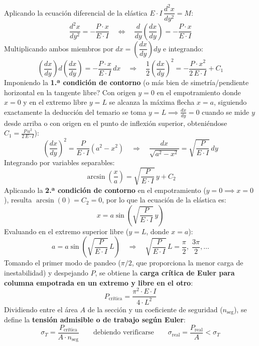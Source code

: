 Aplicando la ecuación diferencial de la elástica $E\cdot I\,\dfrac{d^2x}{dy^2} = M$:
\begin{equation*}
    \frac{d^2x}{dy^2} = -\frac{P\cdot x}{E\cdot I} \quad \Longleftrightarrow \quad \frac{d}{dy}\left(\frac{dx}{dy}\right) = -\frac{P\cdot x}{E\cdot I}
\end{equation*}
Multiplicando ambos miembros por $dx = \left(\dfrac{dx}{dy}\right)dy$ e integrando:
\begin{equation*}
    \left(\frac{dx}{dy}\right) d\left(\frac{dx}{dy}\right) = -\frac{P\cdot x}{E\cdot I}\,dx \quad \Longrightarrow \quad \frac{1}{2}\left(\frac{dx}{dy}\right)^2 = -\frac{P\cdot x^2}{2\,E\cdot I} + C_1
\end{equation*}
Imponiendo la \textbf{1.ª condición de contorno} (o más bien de simetría/pendiente horizontal en la tangente libre? Con origen $y=0$ en el empotramiento donde $x=0$ y en el extremo libre $y=L$ se alcanza la máxima flecha $x=a$, siguiendo exactamente la deducción del temario se toma $y=L \implies \frac{dx}{dy}=0$ cuando se mide $y$ desde arriba o con origen en el punto de inflexión superior, obteniéndose $C_1 = \frac{P\,a^2}{2\,E\cdot I}$):
\begin{equation*}
    \left(\frac{dx}{dy}\right)^2 = \frac{P}{E\cdot I}\left(a^2 - x^2\right) \quad \Longrightarrow \quad \frac{dx}{\sqrt{a^2 - x^2}} = \sqrt{\frac{P}{E\cdot I}}\,dy
\end{equation*}
Integrando por variables separables:
\begin{equation*}
    \arcsin\left(\frac{x}{a}\right) = \sqrt{\frac{P}{E\cdot I}}\,y + C_2
\end{equation*}
Aplicando la \textbf{2.ª condición de contorno} en el empotramiento ($y = 0 \implies x = 0$), resulta $\arcsin(0) = C_2 = 0$, por lo que la ecuación de la elástica es:
\begin{equation}
    x = a \sin\left(\sqrt{\frac{P}{E\cdot I}}\,y\right)
    \label{eq:t9_elastica_seno}
\end{equation}
Evaluando en el extremo superior libre ($y = L$, donde $x = a$):
\begin{equation*}
    a = a\sin\left(\sqrt{\frac{P}{E\cdot I}}\,L\right) \quad \Longrightarrow \quad \sqrt{\frac{P}{E\cdot I}}\,L = \frac{\pi}{2}, \;\frac{3\pi}{2}, \dots
\end{equation*}
Tomando el primer modo de pandeo ($\pi/2$, que proporciona la menor carga de inestabilidad) y despejando $P$, se obtiene la \textbf{carga crítica de Euler para columna empotrada en un extremo y libre en el otro}:
\begin{equation}
    P_{\text{crítica}} = \frac{\pi^2 \cdot E \cdot I}{4 \cdot L^2}
    \label{eq:t9_Pcrit_empotrada_libre}
\end{equation}
Dividiendo entre el área $A$ de la sección y un coeficiente de seguridad ($n_{\text{seg}}$), se define la \textbf{tensión admisible o de trabajo según Euler}:
\begin{equation}
    \sigma_T = \frac{P_{\text{crítica}}}{A \cdot n_{\text{seg}}} \qquad \text{debiendo verificarse} \qquad \sigma_{\text{real}} = \frac{P_{\text{real}}}{A} < \sigma_T
    \label{eq:t9_sigmaT_euler}
\end{equation}

